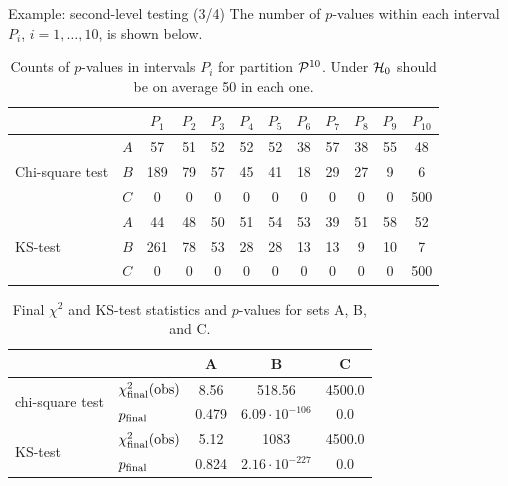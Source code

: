 \documentclass[aspectratio=169]{beamer}
\begin{document}
\begin{frame}{Example: second-level testing (3/4)}
The number of $p$-values within each interval $P_i$, $i=1,\ldots,10$, is shown below.

\begin{table}[h]
\centering
\small
\begin{tabular}{|l|l|c|c|c|c|c|c|c|c|c|c|}
\hline
   &   & $P_1$ & $P_2$ & $P_3$ & $P_4$ & $P_5$ & $P_6$ & $P_7$ & $P_8$ & $P_9$ & $P_{10}$ \\ \hline
\multirow{3}{*}{Chi-square test}
& $A$ & 57 & 51 & 52 & 52 & 52 & 38 & 57 & 38 & 55 & 48 \\
& $B$ & 189 & 79 & 57 & 45 & 41 & 18 & 29 & 27 & 9 & 6 \\
& $C$ & 0 & 0 & 0 & 0 & 0 & 0 & 0 & 0 & 0 & 500 \\ \hline
\multirow{3}{*}{KS-test}
& $A$ & 44 & 48 & 50 & 51 & 54 & 53 & 39 & 51 & 58 & 52 \\
& $B$ & 261 & 78 & 53 & 28 & 28 & 13 & 13 & 9 & 10 & 7  \\
& $C$ & 0 & 0 & 0 & 0 & 0 & 0 & 0 & 0 & 0 & 500 \\ \hline
\end{tabular}
\caption{Counts of $p$-values in intervals $P_i$ for partition ${\cal P}^{10}$.
Under ${\cal H}_0$ should be on average 50 in each one.}
\label{tab:sec-level-example-bins}
\end{table}
\pause
\begin{table}[h!]
\centering
\small
\begin{tabular}{|l|l|c|c|c|}
\hline
   &  &  {A} &  {B} &  {C} \\ \hline
\multirow{2}{*}{chi-square test}
& $\chi^2_{\rm final}(\mathrm{obs})$ & 8.56 & 518.56 & 4500.0 \\
& $p_{\rm final}$ & 0.479 & $6.09 \cdot 10^{-106}$ & 0.0 \\ \hline
\multirow{2}{*}{KS-test}
& $\chi^2_{\rm final}(\mathrm{obs})$ & 5.12 & 1083 & 4500.0 \\
& $p_{\rm final}$ & 0.824 & $2.16 \cdot 10^{-227}$ & 0.0 \\ \hline
\end{tabular}
\caption{Final $\chi^2$ and KS-test statistics and $p$-values for sets A, B, and C.}
\label{tab:comparison_tests}
\end{table}
\end{frame}
\end{document}
